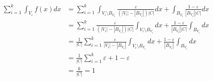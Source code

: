 \documentclass[11pt,fleqn]{book} %
\begin{document}
\begin{appendices}
\begin{align*}
	\sum_{i=1}^k \int_{V_i}f(x)dx 
	&= \sum_{i=1}^k \int_{V_i \setminus B_{V_i}}\frac{\varepsilon}{(|V_i|-|B_{V_i}|)|C|}dx + \int_{B_{V_i}}\frac{1-\varepsilon}{|B_{V_i}||C|}dx \\
	&= \sum_{i=1}^k \frac{\varepsilon}{(|V_i|-|B_{V_i}|)|C|}\int_{V_i \setminus B_{V_i}}dx + \frac{1-\varepsilon}{|B_{V_i}||C|}\int_{B_{V_i}}dx \\
	&= \frac{1}{|C|} \sum_{i=1}^k \frac{\varepsilon}{|V_i|-|B_{V_i}|}\int_{V_i \setminus B_{V_i}}dx + \frac{1-\varepsilon}{|B_{V_i}|}\int_{B_{V_i}}dx \\
	&= \frac{1}{|C|} \sum_{i=1}^k \varepsilon + 1 - \varepsilon\\
	&= \frac{k}{|C|} = 1
\end{align*}

\end{appendices}

\end{document}
